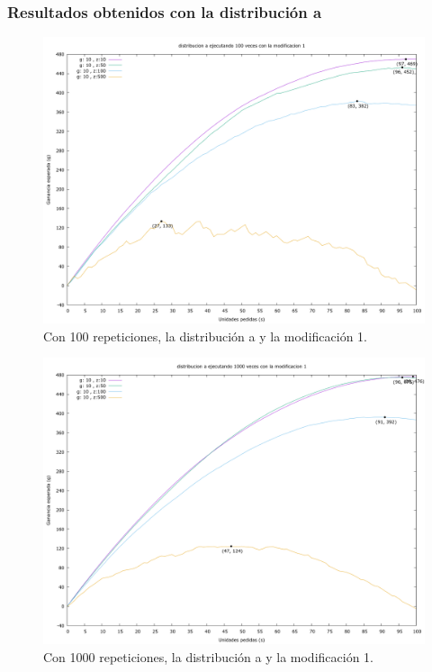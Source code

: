 \documentclass[12pt, spanish]{article}
\begin{document}
\subsubsection{Resultados obtenidos con la distribución a}

\begin{figure}[H]
	\centering
	\includegraphics[scale = 0.3]{prob_a/datos_a_100_1.png}
	\caption{Con 100 repeticiones, la distribución a y la modificación 1.}
	\label{fig:ej1_a_100}

\end{figure}

\begin{figure}[H]
	\centering
	\includegraphics[scale = 0.3]{prob_a/datos_a_1000_1.png}
	\caption{Con 1000 repeticiones, la distribución a y la modificación 1.}
	\label{fig:ej1_a_1000}

\end{figure}
\end{document}
